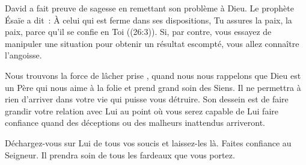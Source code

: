 David a fait preuve de sagesse en remettant son problème à Dieu.
 Le prophète Ésaïe a dit~:
 \og \`A celui qui est ferme dans ses dispositions, Tu assures la paix,
 la paix, parce qu'il se confie en Toi \fg{} ((26:3)).
 Si, par contre, vous essayez de manipuler une situation pour obtenir
 un résultat escompté, vous allez connaître l'angoisse. 

Nous trouvons la force de \og lâcher prise \fg{},
 quand nous nous rappelons que Dieu est un Père qui nous aime
 à la folie et prend grand soin des Siens.
 Il ne permettra à rien d'arriver dans votre vie qui puisse vous détruire.
 Son dessein est de faire grandir votre relation avec Lui au point
 où vous serez capable de Lui faire confiance quand des déceptions
 ou des malheurs inattendus arriveront. 

Déchargez-vous sur Lui de tous vos soucis et laissez-les là.
 Faites confiance au Seigneur.
 Il prendra soin de tous les fardeaux que vous portez. 

\dvrule


